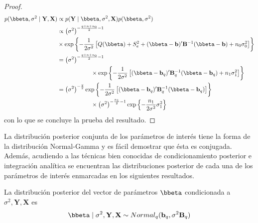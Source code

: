 \begin{proof}
\begin{align*}
p(\bbeta,\sigma^2 \mid \mathbf{Y},\mathbf{X})&\propto p(\mathbf{Y} \mid \bbeta,\sigma^2,\mathbf{X})p(\bbeta,\sigma^2)\\
&\propto \left(\sigma^2\right)^{-\frac{q+n+n_0}{2}-1}\\
&\hspace{0cm}\times
\exp\left\{-\frac{1}{2\sigma^2}
\left[Q(\bbeta)+S^2_e+(\bbeta-\mathbf{b})'\mathbf{B}^{-1}(\bbeta-\mathbf{b})+n_0\sigma^2_0\right]
\right\}\\
&= \left(\sigma^2\right)^{-\frac{q+n+n_0}{2}-1}\\
&\hspace{2cm}\times
\exp\left\{-\frac{1}{2\sigma^2}
\left[(\bbeta-\mathbf{b}_q)'\mathbf{B}^{-1}_q(\bbeta-\mathbf{b}_q)+n_1\sigma_1^2 \right]
\right\}\\
&= \left(\sigma^2\right)^{-\frac{q}{2}}
\exp\left\{-\frac{1}{2\sigma^2}
\left[(\bbeta-\mathbf{b}_q)'\mathbf{B}^{-1}_q(\bbeta-\mathbf{b}_q)\right]
\right\}\\
&\hspace{2cm}\times
\left(\sigma^2\right)^{-\frac{n_1}{2}-1}
\exp\left\{-\frac{n_1}{2\sigma^2}\sigma_1^2 \right\}
\end{align*}
con lo que se concluye la prueba del resultado.
\end{proof}

La distribución posterior conjunta de los parámetros de interés tiene la forma de la distribución Normal-Gamma y es fácil demostrar que ésta es conjugada. Además, acudiendo a las técnicas bien conocidas de condicionamiento posterior e integración analítica se encuentran las distribuciones posterior de cada una de los parámetros de interés enmarcadas en los siguientes resultados.

\begin{Res}
La distribución posterior del vector de parámetros $\bbeta$ condicionada a $\sigma^2,\mathbf{Y},\mathbf{X}$ es
\begin{equation*}
\bbeta \mid \sigma^2,\mathbf{Y},\mathbf{X} \sim Normal_q(\mathbf{b}_q,\sigma^2\mathbf{B}_q)
\end{equation*}
\end{Res}

